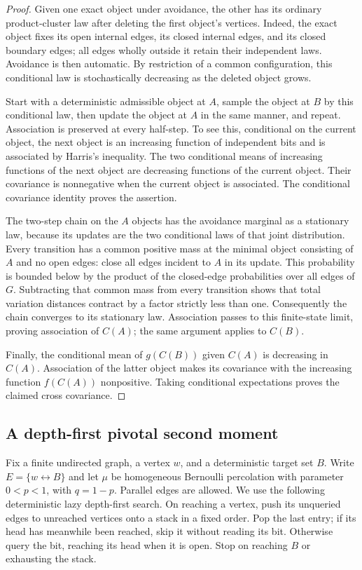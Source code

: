 \documentclass[11pt]{article}
\theoremstyle{definition}
\begin{document}
\begin{proof}
Given one exact object under avoidance, the other has its ordinary
product-cluster law after deleting the first object's vertices.
Indeed, the exact object fixes its open internal edges, its closed
internal edges, and its closed boundary edges; all edges wholly outside
it retain their independent laws. Avoidance is then automatic.
By restriction of a common configuration, this conditional law is
stochastically decreasing as the deleted object grows.

Start with a deterministic admissible object at $A$, sample the object
at $B$ by this conditional law, then update the object at $A$ in the
same manner, and repeat. Association is preserved at every half-step.
To see this, conditional on the current object, the next object is an
increasing function of independent bits and is associated by Harris's
inequality. The two conditional means of increasing functions of the
next object are decreasing functions of the current object. Their
covariance is nonnegative when the current object is associated.
The conditional covariance identity proves the assertion.

The two-step chain on the $A$ objects has the avoidance marginal as
a stationary law, because its updates are the two conditional laws of
that joint distribution. Every transition has a common positive mass
at the minimal object consisting of $A$ and no open edges: close all
edges incident to $A$ in its update. This probability is bounded below
by the product of the closed-edge probabilities over all edges of $G$.
Subtracting that common mass from every transition shows that total
variation distances contract by a factor strictly less than one.
Consequently the chain converges to its stationary law. Association
passes to this finite-state limit, proving association of $C(A)$;
the same argument applies to $C(B)$.

Finally, the conditional mean of $g(C(B))$ given $C(A)$ is decreasing
in $C(A)$. Association of the latter object makes its covariance with
the increasing function $f(C(A))$ nonpositive. Taking conditional
expectations proves the claimed cross covariance.
\end{proof}

\subsection{A depth-first pivotal second moment}

Fix a finite undirected graph, a vertex $w$, and a deterministic target
set $B$. Write $E=\{w\leftrightarrow B\}$ and let $\mu$ be homogeneous
Bernoulli percolation with parameter $0<p<1$, with $q=1-p$.
Parallel edges are allowed. We use the following deterministic lazy
depth-first search. On reaching a vertex, push its unqueried edges to
unreached vertices onto a stack in a fixed order. Pop the last entry;
if its head has meanwhile been reached, skip it without reading its
bit. Otherwise query the bit, reaching its head when it is open.
Stop on reaching $B$ or exhausting the stack.
\end{document}
